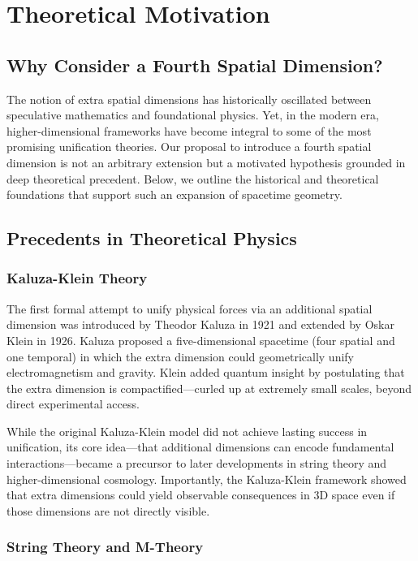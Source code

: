 \documentclass[12pt]{article}
\begin{document}
\thispagestyle{plain}

\section{Theoretical Motivation}

\subsection{Why Consider a Fourth Spatial Dimension?}

The notion of extra spatial dimensions has historically oscillated between speculative mathematics and foundational physics. Yet, in the modern era, higher-dimensional frameworks have become integral to some of the most promising unification theories. Our proposal to introduce a fourth spatial dimension is not an arbitrary extension but a motivated hypothesis grounded in deep theoretical precedent. Below, we outline the historical and theoretical foundations that support such an expansion of spacetime geometry.

\subsection{Precedents in Theoretical Physics}

\subsubsection{Kaluza-Klein Theory}

The first formal attempt to unify physical forces via an additional spatial dimension was introduced by Theodor Kaluza in 1921 and extended by Oskar Klein in 1926. Kaluza proposed a five-dimensional spacetime (four spatial and one temporal) in which the extra dimension could geometrically unify electromagnetism and gravity. Klein added quantum insight by postulating that the extra dimension is compactified—curled up at extremely small scales, beyond direct experimental access.

While the original Kaluza-Klein model did not achieve lasting success in unification, its core idea—that additional dimensions can encode fundamental interactions—became a precursor to later developments in string theory and higher-dimensional cosmology. Importantly, the Kaluza-Klein framework showed that extra dimensions could yield observable consequences in 3D space even if those dimensions are not directly visible.

\subsubsection{String Theory and M-Theory}
\end{document}
